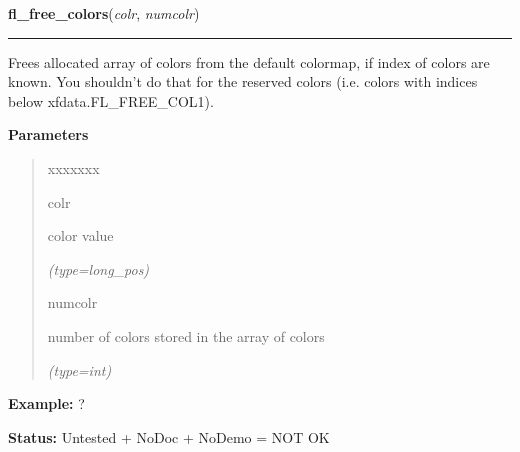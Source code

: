     \label{xformslib:flbasic:fl_free_colors}

    \vspace{0.5ex}

\hspace{.8\funcindent}\begin{boxedminipage}{\funcwidth}

    \raggedright \textbf{fl\_free\_colors}(\textit{colr}, \textit{numcolr})

    \vspace{-1.5ex}

    \rule{\textwidth}{0.5\fboxrule}
\setlength{\parskip}{2ex}
    Frees allocated array of colors from the default colormap, if index of 
    colors are known. You shouldn't do that for the reserved colors (i.e. 
    colors with indices below xfdata.FL\_FREE\_COL1).

\setlength{\parskip}{1ex}
      \textbf{Parameters}
      \vspace{-1ex}

      \begin{quote}
        \begin{Ventry}{xxxxxxx}

          \item[colr]

          color value

            {\it (type=long\_pos)}

          \item[numcolr]

          number of colors stored in the array of colors

            {\it (type=int)}

        \end{Ventry}

      \end{quote}

\textbf{Example:} ?



\textbf{Status:} Untested + NoDoc + NoDemo = NOT OK



    \end{boxedminipage}

    \label{xformslib:flbasic:fl_free_pixels}

